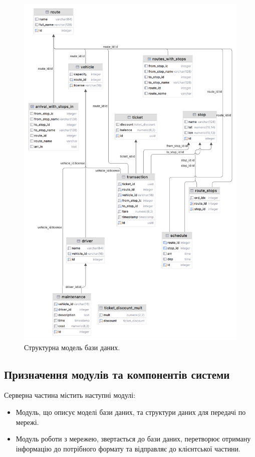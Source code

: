 \documentclass[oneside,14pt]{extarticle}
\begin{document}
\begin{figure}[H]
	\centering
	\includegraphics[scale=0.15]{schema}
	\caption{Структурна модель бази даних.}
\end{figure}

\subsection{Призначення модулів та компонентів системи}
Серверна частина містить наступні модулі:
\begin{itemize}
\item Модуль, що описує моделі бази даних, та структури даних для передачі по мережі.
\item Модуль роботи з мережею, звертається до бази даних, перетворює отриману інформацію до потрібного формату та відправляє до клієнтської частини.
\end{itemize}
\end{document}
